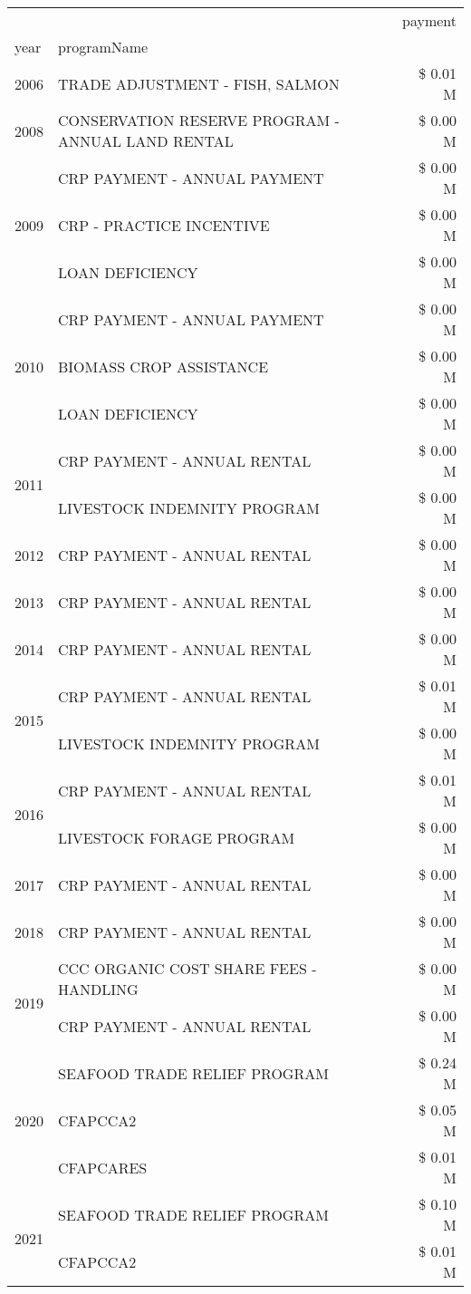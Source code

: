 \begin{tabular}{llr}
\toprule
 &  & payment \\
year & programName &  \\
\midrule
2006 & TRADE ADJUSTMENT - FISH, SALMON & \$ 0.01 M \\
\cline{1-3}
2008 & CONSERVATION RESERVE PROGRAM - ANNUAL LAND RENTAL & \$ 0.00 M \\
\cline{1-3}
\multirow[t]{3}{*}{2009} & CRP PAYMENT - ANNUAL PAYMENT & \$ 0.00 M \\
 & CRP - PRACTICE INCENTIVE & \$ 0.00 M \\
 & LOAN DEFICIENCY & \$ 0.00 M \\
\cline{1-3}
\multirow[t]{3}{*}{2010} & CRP PAYMENT - ANNUAL PAYMENT & \$ 0.00 M \\
 & BIOMASS CROP ASSISTANCE & \$ 0.00 M \\
 & LOAN DEFICIENCY & \$ 0.00 M \\
\cline{1-3}
\multirow[t]{2}{*}{2011} & CRP PAYMENT - ANNUAL RENTAL & \$ 0.00 M \\
 & LIVESTOCK INDEMNITY PROGRAM & \$ 0.00 M \\
\cline{1-3}
2012 & CRP PAYMENT - ANNUAL RENTAL & \$ 0.00 M \\
\cline{1-3}
2013 & CRP PAYMENT - ANNUAL RENTAL & \$ 0.00 M \\
\cline{1-3}
2014 & CRP PAYMENT - ANNUAL RENTAL & \$ 0.00 M \\
\cline{1-3}
\multirow[t]{2}{*}{2015} & CRP PAYMENT - ANNUAL RENTAL & \$ 0.01 M \\
 & LIVESTOCK INDEMNITY PROGRAM & \$ 0.00 M \\
\cline{1-3}
\multirow[t]{2}{*}{2016} & CRP PAYMENT - ANNUAL RENTAL & \$ 0.01 M \\
 & LIVESTOCK FORAGE PROGRAM & \$ 0.00 M \\
\cline{1-3}
2017 & CRP PAYMENT - ANNUAL RENTAL & \$ 0.00 M \\
\cline{1-3}
2018 & CRP PAYMENT - ANNUAL RENTAL & \$ 0.00 M \\
\cline{1-3}
\multirow[t]{2}{*}{2019} & CCC ORGANIC COST SHARE FEES - HANDLING & \$ 0.00 M \\
 & CRP PAYMENT - ANNUAL RENTAL & \$ 0.00 M \\
\cline{1-3}
\multirow[t]{3}{*}{2020} & SEAFOOD TRADE RELIEF PROGRAM & \$ 0.24 M \\
 & CFAPCCA2 & \$ 0.05 M \\
 & CFAPCARES & \$ 0.01 M \\
\cline{1-3}
\multirow[t]{2}{*}{2021} & SEAFOOD TRADE RELIEF PROGRAM & \$ 0.10 M \\
 & CFAPCCA2 & \$ 0.01 M \\
\cline{1-3}
\bottomrule
\end{tabular}

